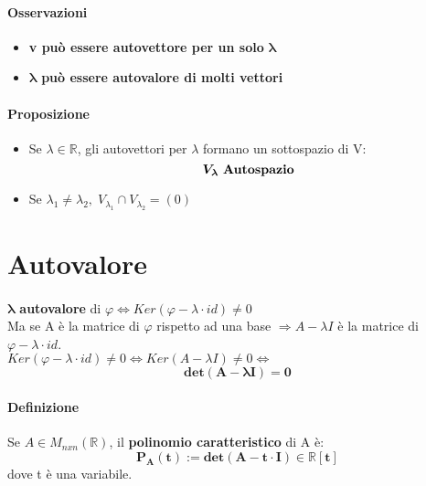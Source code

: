 \documentclass[a4paper, 12pt]{report}
\begin{document}
        \paragraph{Osservazioni}
        \begin{itemize}
            \item \textbf{v può essere autovettore per un solo} $\boldsymbol{\lambda}$
            \item $\boldsymbol{\lambda}$ \textbf{può essere autovalore di molti vettori} 
        \end{itemize}
        \paragraph{Proposizione}
        \begin{itemize}
            \item Se $\lambda \in \mathbb{R}$, gli autovettori per $\lambda$ formano un sottospazio di V:$$\boldsymbol{V_{\lambda}} \text{ \textbf{Autospazio}}$$
            \item Se $\lambda_1 \neq \lambda_2, \; V_{\lambda_1} \cap V_{\lambda_2}=(0)$
        \end{itemize}
        \clearpage
        \section{Autovalore}
            \paragraph{}$\boldsymbol{\lambda}$ \textbf{autovalore} di $\varphi \Leftrightarrow Ker(\varphi-\lambda\cdot id)\neq 0$
            \\Ma se A è la matrice di $\varphi$ rispetto ad una base $\Rightarrow
            A-\lambda I$ è la matrice di $\varphi-\lambda \cdot id$.\\
            $Ker(\varphi-\lambda \cdot id)\neq 0 \Leftrightarrow Ker(A-\lambda I)\neq 0 \Leftrightarrow$ $$\boldsymbol{det(A-\lambda I)=0}$$
            \paragraph{Definizione}Se $A \in M_{nxn} (\mathbb{R})$, il \textbf{polinomio caratteristico} di A è:
            $$\boldsymbol{P_A(t):= det(A-t\cdot I) \in \mathbb{R}[t]}$$
            dove t è una variabile.
\end{document}
